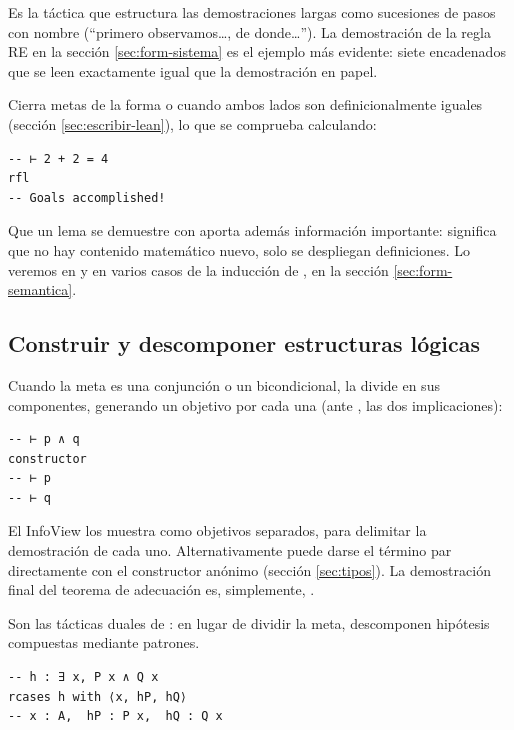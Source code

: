 Es la táctica que estructura las demostraciones largas como sucesiones de pasos con nombre (``primero observamos\dots, de donde\dots''). La demostración de la regla RE en la sección \ref{sec:form-sistema} es el ejemplo más evidente: siete  encadenados que se leen exactamente igual que la demostración en papel.

 Cierra metas de la forma  o  cuando ambos lados son definicionalmente iguales (sección \ref{sec:escribir-lean}), lo que se comprueba calculando:

\begin{lstlisting}
-- ⊢ 2 + 2 = 4
rfl
-- Goals accomplished!
\end{lstlisting}

Que un lema se demuestre con  aporta además información importante: significa que no hay contenido matemático nuevo, solo se despliegan definiciones. Lo veremos en  y en varios casos de la inducción de , en la sección \ref{sec:form-semantica}.

\subsection{Construir y descomponer estructuras lógicas}

 Cuando la meta es una conjunción o un bicondicional, la divide en sus componentes, generando un objetivo por cada una (ante , las dos implicaciones):

\begin{lstlisting}
-- ⊢ p ∧ q
constructor
-- ⊢ p
-- ⊢ q
\end{lstlisting}

El InfoView los muestra como objetivos separados, para delimitar la demostración de cada uno. Alternativamente puede darse el término par directamente con el constructor anónimo (sección \ref{sec:tipos}). La demostración final del teorema de adecuación es, simplemente, .

 Son las tácticas duales de : en lugar de dividir la meta, descomponen hipótesis compuestas mediante patrones.

\begin{lstlisting}
-- h : ∃ x, P x ∧ Q x
rcases h with ⟨x, hP, hQ⟩
-- x : A,  hP : P x,  hQ : Q x
\end{lstlisting}

